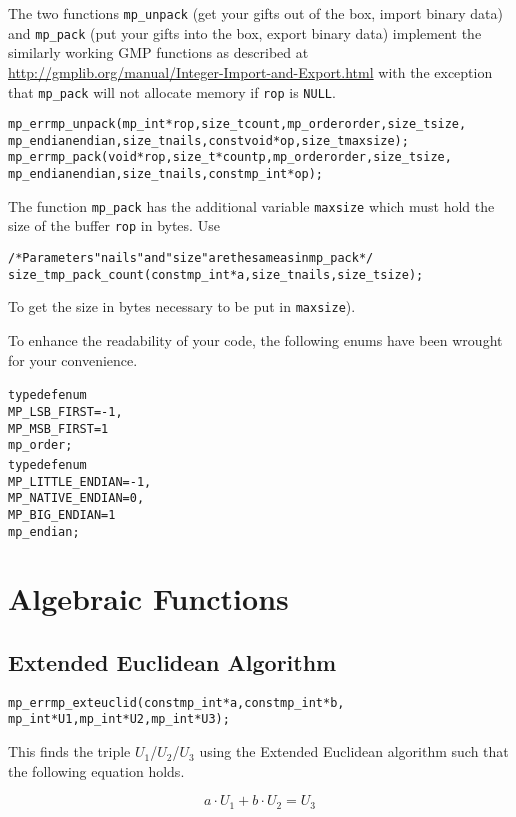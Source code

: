 \documentclass[synpaper]{book}
\begin{document}
The two functions \texttt{mp\_unpack} (get your gifts out of the box, import binary data) and
\texttt{mp\_pack} (put your gifts into the box, export binary data) implement the similarly working
GMP functions as described at \url{http://gmplib.org/manual/Integer-Import-and-Export.html} with
the exception that \texttt{mp\_pack} will not allocate memory if \texttt{rop} is \texttt{NULL}.
 
\begin{alltt}
mp_err mp_unpack(mp_int *rop, size_t count, mp_order order, size_t size,
             mp_endian endian, size_t nails, const void *op, size_t maxsize);
mp_err mp_pack(void *rop, size_t *countp, mp_order order, size_t size,
             mp_endian endian, size_t nails, const mp_int *op);
\end{alltt}
The function \texttt{mp\_pack} has the additional variable \texttt{maxsize} which must hold the
size of the buffer \texttt{rop} in bytes. Use
\begin{alltt}
/* Parameters "nails" and "size" are the same as in mp_pack */
size_t mp_pack_count(const mp_int *a, size_t nails, size_t size);
\end{alltt}
To get the size in bytes necessary to be put in \texttt{maxsize}).

To enhance the readability of your code, the following enums have been wrought for your
convenience.
\begin{alltt}
typedef enum {
   MP_LSB_FIRST = -1,
   MP_MSB_FIRST =  1
} mp_order;
typedef enum {
   MP_LITTLE_ENDIAN  = -1,
   MP_NATIVE_ENDIAN  =  0,
   MP_BIG_ENDIAN     =  1
} mp_endian;
\end{alltt}

\chapter{Algebraic Functions}
\section{Extended Euclidean Algorithm}
\begin{alltt}
mp_err mp_exteuclid(const mp_int *a, const mp_int *b,
                 mp_int *U1, mp_int *U2, mp_int *U3);
\end{alltt}

This finds the triple $U_1$/$U_2$/$U_3$ using the Extended Euclidean algorithm such that the
following equation holds.

\begin{equation}
  a \cdot U_1 + b \cdot U_2 = U_3
\end{equation}
\end{document}
